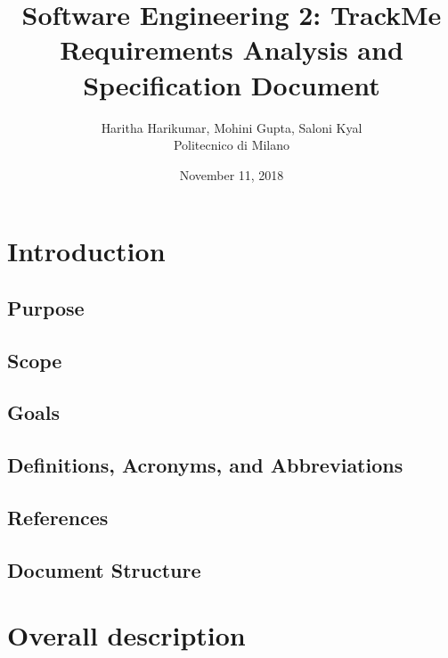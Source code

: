 \documentclass[12pt, a4paper]{report}
\begin{document}
\title{Software Engineering 2: TrackMe \\ \vspace{1em} Requirements Analysis and Specification Document}
\author{Haritha Harikumar, Mohini Gupta, Saloni Kyal\\
Politecnico di Milano}
\date{November 11, 2018}
\maketitle
\tableofcontents

\chapter{Introduction}
\label{ch:introduction}

\section{Purpose}


\section{Scope}


\section{Goals}


\section{Definitions, Acronyms, and Abbreviations}


\section{References}


\section{Document Structure}


\chapter{Overall description}
\label{ch:overall-desc}
\end{document}
